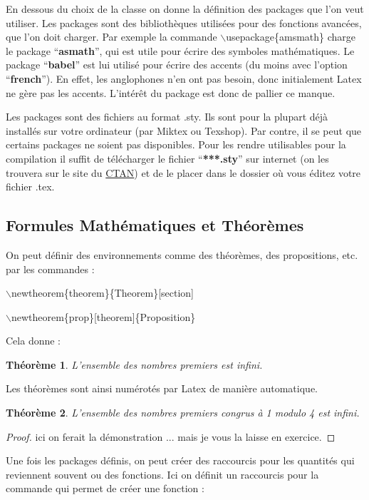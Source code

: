 \documentclass[11pt]{article}
\newtheorem{theorem}{Théorème}[section]
\theoremstyle{remark}
\theoremstyle{definition}
\begin{document}
En dessous du choix de la classe on donne la définition des packages que l'on veut utiliser. Les packages sont des bibliothèques utilisées pour des fonctions avancées, que l'on doit charger. Par exemple la commande  $\backslash$usepackage\{amsmath\} charge le package ``\textbf{asmath}'', qui est utile  pour écrire des symboles mathématiques. Le package ``\textbf{babel}''  est lui utilisé pour écrire des accents (du moins avec l'option ``\textbf{french}''). En effet, les anglophones n'en ont pas besoin, donc initialement Latex ne gère pas les accents. L'intérêt du package est donc de pallier ce manque. \medskip

Les packages sont des fichiers au format .sty. Ils sont pour la plupart déjà installés sur votre ordinateur (par Miktex ou Texshop). Par contre, il se peut que certains packages ne soient pas disponibles.  Pour les rendre utilisables pour la compilation il suffit de télécharger le fichier ``\textbf{***.sty}''  sur internet (on les trouvera sur le site du  \href{http://www.ctan.org/}{CTAN})  et de le placer dans le dossier où vous éditez votre fichier .tex.     \medskip

\subsection{Formules Mathématiques et Théorèmes}
On peut définir des environnements comme des théorèmes, des propositions, etc. par les commandes :\medskip

$\backslash$newtheorem\{theorem\}\{Theorem\}[section]

$\backslash$newtheorem\{prop\}[theorem]\{Proposition\}\medskip

Cela donne :

\begin{theorem}
 L'ensemble des nombres premiers est infini.
\end{theorem}
Les théorèmes  sont ainsi numérotés par Latex de manière automatique.

\begin{theorem}
 L'ensemble des nombres premiers congrus à 1 modulo 4 est infini.
\end{theorem}

\begin{proof}
 ici on ferait la démonstration ... mais  je vous la laisse en exercice.
\end{proof}



Une fois les packages définis, on peut créer des raccourcis pour les quantités qui reviennent souvent ou des fonctions. Ici on définit un raccourcis pour la commande qui permet de créer une fonction :\medskip
\end{document}
